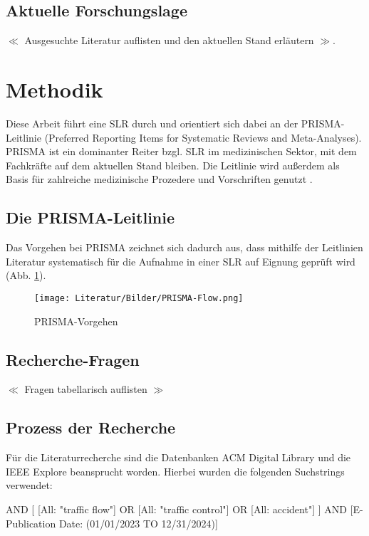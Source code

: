 \documentclass{scrartcl}
\begin{document}
\subsection{Aktuelle Forschungslage}
$\ll$ Ausgesuchte Literatur auflisten und den aktuellen Stand erläutern $\gg$.

\section{Methodik}

Diese Arbeit führt eine SLR durch und orientiert sich
dabei an der PRISMA-Leitlinie (Preferred Reporting Items for Systematic Reviews and
Meta-Analyses).  PRISMA ist ein dominanter Reiter bzgl. SLR im medizinischen Sektor,
mit dem Fachkräfte auf dem aktuellen Stand bleiben.  Die Leitlinie wird außerdem als
Basis für zahlreiche medizinische Prozedere und Vorschriften genutzt \cite{prisma}.

\subsection{Die PRISMA-Leitlinie}
Das Vorgehen bei PRISMA zeichnet sich dadurch aus, dass mithilfe der Leitlinien
Literatur systematisch für die Aufnahme in einer SLR auf Eignung geprüft wird 
(Abb. \ref{fig:prisma1}).

\begin{figure}[h]
   \begin{center}
      \texttt{[image: Literatur/Bilder/PRISMA-Flow.png]}
   \end{center}
   \caption{PRISMA-Vorgehen \cite{ex1}}
   \label{fig:prisma1}
\end{figure}


\subsection{Recherche-Fragen}

$\ll$ Fragen tabellarisch auflisten $\gg$

\subsection{Prozess der Recherche}

Für die Literaturrecherche sind die Datenbanken ACM Digital Library und die IEEE Explore
beansprucht worden. Hierbei wurden die folgenden Suchstrings verwendet:

\begin{tcolorbox}
   AND [
         [All: "traffic flow"]
         OR [All: "traffic control"]
         OR [All: \dq accident"]
      ]
   AND [E-Publication Date: (01/01/2023 TO 12/31/2024)]
\end{tcolorbox}
\end{document}
